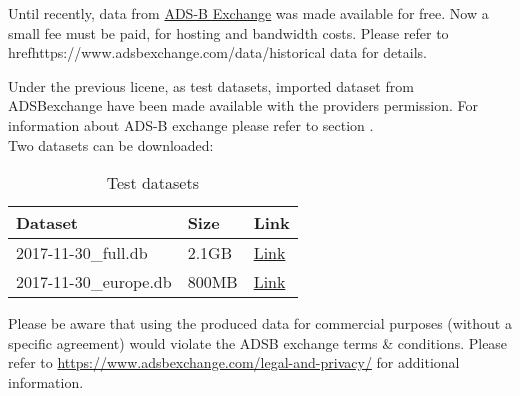 Until recently, data from \href{https://www.adsbexchange.com/}{ADS-B Exchange} was made available for free. Now a small fee must be paid, for hosting and bandwidth costs. Please refer to href{https://www.adsbexchange.com/data/}{historical data} for details.

Under the previous licene, as test datasets, imported dataset from ADSBexchange have been made available with the providers permission. For information about ADS-B exchange please refer to section . \\

Two datasets can be downloaded:

\begin{table}[H]
  \center
  \begin{tabular}{ | l | l | l |}
    \hline
    \textbf{Dataset} & Size & \textbf{Link} \\ \hline
    2017-11-30\_full.db & 2.1GB & \href{https://drive.google.com/open?id=19JgE8kgVG2lodIyI6Vo8ac7aNY7pM1i_}{Link} \\ \hline
    2017-11-30\_europe.db & 800MB & \href{https://drive.google.com/open?id=1s73R9IEq_8KePC96-a2_seXxZ-Ybhisd}{Link} \\
    \hline
  \end{tabular}
  \caption{Test datasets}
\end{table}

Please be aware that using the produced data for commercial purposes (without a specific agreement) would violate the ADSB exchange terms \& conditions. Please refer to \url{https://www.adsbexchange.com/legal-and-privacy/} for additional information.

